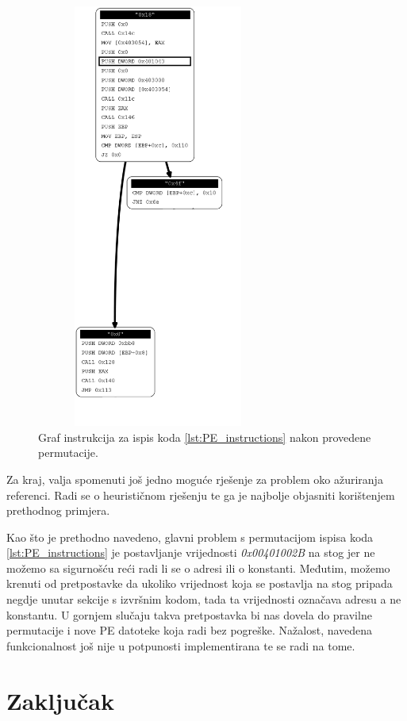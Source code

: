 \documentclass[times, utf8, diplomski, numeric]{fer}
\begin{document}
\begin{figure}[!htb]
\centering
\setlength\fboxsep{0pt}
\setlength\fboxrule{0.5pt}
\includegraphics[width=8cm, height=14cm]{slike/permutator_graph_permutated}
\caption{Graf instrukcija za ispis koda \ref{lst:PE_instructions} nakon provedene permutacije.}
\label{fig:control_flow_graph_permutated} 
\end{figure}

Za kraj, valja spomenuti još jedno
moguće rješenje za problem oko ažuriranja referenci. Radi se o
heurističnom rješenju te ga je najbolje objasniti korištenjem
prethodnog primjera.

Kao što je prethodno navedeno, glavni problem s permutacijom
ispisa koda \ref{lst:PE_instructions} je postavljanje
vrijednosti \emph{0x00401002B} na stog jer ne možemo sa
sigurnošću reći radi li se o adresi ili o konstanti. Međutim,
možemo krenuti od pretpostavke da ukoliko vrijednost koja se
postavlja na stog pripada negdje unutar sekcije s izvršnim
kodom, tada ta vrijednosti označava adresu a ne konstantu. U
gornjem slučaju takva pretpostavka bi nas dovela do pravilne
permutacije i nove PE datoteke koja radi bez pogreške. Nažalost,
navedena funkcionalnost još nije u potpunosti implementirana te
se radi na tome.


\chapter{Zaključak}
\end{document}
